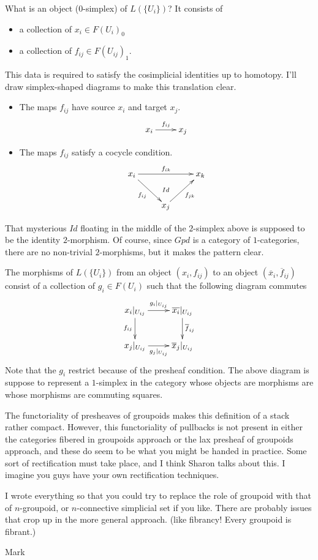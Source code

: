 \medskip\noindent
What is an object ($0$-simplex) of $L(\{U_i\})$?  It consists of 
\begin{itemize}
\item a collection of $x_i \in F(U_i)_0$
\item a collection of $f_{ij} \in F(U_{ij})_1$.
\end{itemize}
This data is required to satisfy the cosimplicial identities up to
homotopy.  I'll draw simplex-shaped diagrams to make this translation
clear. 
\begin{itemize}
\item The maps $f_{ij}$ have source $x_i$ and target $x_j$.
$$ 
\xymatrix{
x_i \ar[r]^{f_{ij}} & x_j
}
$$
\item The maps $f_{ij}$ satisfy a cocycle condition.
$$
\xymatrix{
x_i \ar[rr]^{f_{ik}} \ar[rd]_{f_{ij}} & \ar@{}[d]|{Id} & x_k
\\
& x_j \ar[ru]_{f_{jk}} 
}
$$
\end{itemize}
That mysterious $Id$ floating in the middle of the $2$-simplex above is
supposed to be the identity $2$-morphism.  Of course, since $\textit{Gpd}$ is a
category of $1$-categories, there are no non-trivial $2$-morphisms, but it
makes the pattern clear.

\medskip\noindent
The morphisms of $L(\{U_i\})$ from an object $(x_i, f_{ij})$ to an object
$(\overline{x}_i, \overline{f}_{ij})$ consist of a collection of $g_i \in F(U_i)$ such
that the following diagram commutes
$$
\xymatrix{
x_i\vert_{U_{ij}} \ar[r]^{g_i\vert_{U_{ij}}} \ar[d]_{f_{ij}} & 
\overline{x_i}\vert_{U_{ij}} \ar[d]^{\overline{f}_{ij}}
\\
x_j\vert_{U_{ij}} \ar[r]_{g_j\vert_{U_{ij}}} &
\overline{x}_j\vert_{U_{ij}}
}
$$
Note that the $g_i$ restrict because of the presheaf condition.  The above
diagram is suppose to represent a $1$-simplex in the category whose objects
are morphisms are whose morphisms are commuting squares.

\medskip\noindent
The functoriality of presheaves of groupoids makes this definition of a
stack rather
compact.  However, this functoriality of pullbacks is not present in either
the categories fibered in groupoids approach or the lax presheaf of
groupoids approach, and these do seem to be what you might be handed in
practice.  Some sort of rectification must take place, and I think Sharon
talks about this.  I imagine you guys have your own rectification
techniques.

\medskip\noindent
I wrote everything so that you could try to replace the role of groupoid
with that of $n$-groupoid, or $n$-connective simplicial set if you like.
There are probably issues that crop up in the more general approach. (like
fibrancy!  Every groupoid is fibrant.)

\medskip\noindent
Mark







